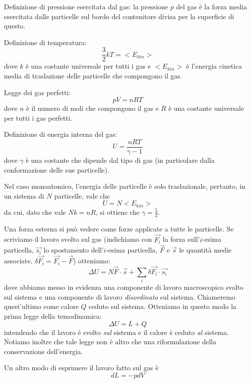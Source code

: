 \documentclass[../main.tex]{subfiles}
\begin{document}
Definizione di pressione esercitata dal gas: la pressione $p$ del gas è la forza media esercitata dalle particelle sul bordo del contenitore divisa
per la superficie di questo.

Definizione di temperatura:
\begin{equation}
	\label{term:temperatura}
	\frac{3}{2}kT=<E_{kin}>
\end{equation}
dove $k$ è una costante universale per tutti i gas e  $<E_{kin}>$ è l'energia cinetica media di traslazione delle particelle che compongono il gas.

Legge dei gas perfetti:
\begin{equation}
	\label{term:perfetti}
	pV=nRT
\end{equation}
dove $n$ è il numero di moli che compongono il gas e $R$ è una costante universale per tutti i gas perfetti.

Definizione di energia interna del gas:
\begin{equation}
	\label{term:uinterna}
	U = \frac{nRT}{\gamma-1}
\end{equation}
dove $\gamma$ è una costante che dipende dal tipo di gas (in particolare dalla conformazione delle sue particelle).

Nel caso monoatomico, l'energia delle particelle è solo traslazionale, pertanto, in un sistema di $N$ particelle, vale che
\[
	U = N <E_{kin}>
\]
da cui, dato che vale $Nk = nR$, si ottiene che $\gamma = \frac{5}{3}$.

Una forza esterna si può vedere come forze applicate a tutte le particelle. Se scriviamo il lavoro svolto sul gas (indichiamo con $\vec{F_i}$ la forza
sull'$i$-esima particella, $\vec{s_i}$ lo spostamento dell'$i$-esima particella, $\vec F$ e $\vec s$ le quantità medie associate,
$\delta \vec{F_i} = \vec{F_i}-\vec F$) otteniamo:
\[
	\Delta U  = N \vec F \cdot \vec s + \sum_i \delta \vec {F_i}\cdot \vec {s_i}
\]
dove abbiamo messo in evidenza una componente di lavoro macroscopico svolto sul sistema e una componente di lavoro \emph{disordinato} sul sistema.
Chiameremo quest'ultimo come calore $Q$ ceduto sul sistema. Otteniamo in questo modo la prima legge della temodinamica:
\begin{equation}
	\label{term:1legge}
	\Delta U = L + Q
\end{equation}
intendendo che il lavoro è svolto \emph{sul} sistema e il calore è ceduto \emph{al} sistema. Notiamo inoltre che tale legge non è altro che una
riformulazione della conservazione dell'energia.

Un altro modo di esprimere  il lavoro fatto sul gas è
\begin{equation}
	\label{term:lavoro}
	dL = -pdV
\end{equation}
\end{document}
